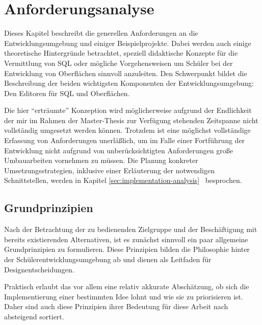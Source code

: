 \section{Anforderungsanalyse}

Dieses Kapitel beschreibt die generellen Anforderungen an die Entwicklungsumgebung und einiger Beispielprojekte. Dabei werden auch einige theoretische Hintergründe betrachtet, speziell didaktische Konzepte für die Vermittlung von SQL oder mögliche Vorgehensweisen um Schüler bei der Entwicklung von Oberflächen sinnvoll anzuleiten. Den Schwerpunkt bildet die Beschreibung der beiden wichtigsten Komponenten der Entwicklungsumgebung: Den Editoren für SQL und Oberflächen.

Die hier ``erträumte'' Konzeption wird möglicherweise aufgrund der Endlichkeit der mir im Rahmen der Master-Thesis zur Verfügung stehenden Zeitspanne nicht vollständig umgesetzt werden können. Trotzdem ist eine möglichst vollständige Erfassung von Anforderungen unerläßlich, um im Falle einer Fortführung der Entwicklung nicht aufgrund von unberücksichtigten Anforderungen große Umbauarbeiten vornehmen zu müssen. Die Planung konkreter Umsetzungsstrategien, inklusive einer Erläuterung der notwendigen Schnittstellen, werden in Kapitel \ref{sec:implementation-analysis}~ besprochen. 


\subsection{Grundprinzipien}
\label{sec:principles}

Nach der Betrachtung der zu bedienenden Zielgruppe  und der Beschäftigung mit bereits existierenden Alternativen, ist es zunächst sinnvoll ein paar allgemeine Grundprinzipien zu formulieren. Diese Prinzipien bilden die Philosophie hinter der Schülerentwicklungsumgebung ab und dienen als Leitfaden für Designentscheidungen.

Praktisch erlaubt das vor allem eine relativ akkurate Abschätzung, ob sich die Implementierung einer bestimmten Idee lohnt und wie sie zu priorisieren ist. Daher sind auch diese Prinzipien ihrer Bedeutung für diese Arbeit nach absteigend sortiert.

